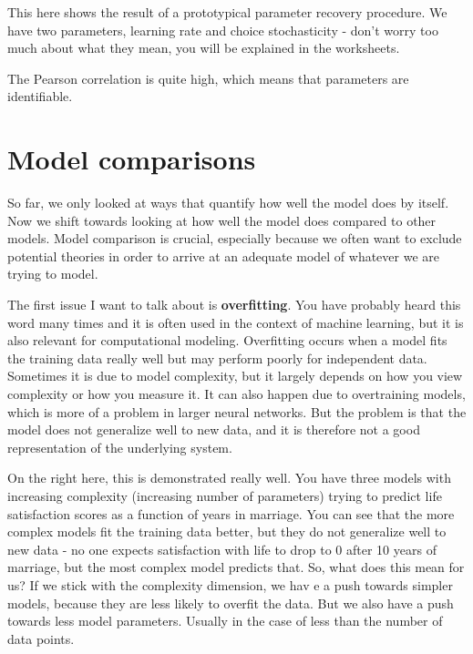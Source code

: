\documentclass[12pt]{article}
\begin{document}
This here shows the result of a prototypical parameter recovery procedure. We have two parameters, learning rate and choice stochasticity - don't worry too much about what they mean, you will be explained in the worksheets.

The Pearson correlation is quite high, which means that parameters are identifiable.

\section{Model comparisons}

So far, we only looked at ways that quantify how well the model does by itself. Now we shift towards looking at how well the model does compared to other models. Model comparison is crucial, especially because we often want to exclude potential theories in order to arrive at an adequate model of whatever we are trying to model.

The first issue I want to talk about is \textbf{overfitting}. You have probably heard this word many times and it is often used in the context of machine learning, but it is also relevant for computational modeling. Overfitting occurs when a model fits the training data really well but may perform poorly for independent data. Sometimes it is due to model complexity, but it largely depends on how you view complexity or how you measure it. It can also happen due to overtraining models, which is more of a problem in larger neural networks. But the problem is that the model does not generalize well to new data, and it is therefore not a good representation of the underlying system.

On the right here, this is demonstrated really well. You have three models with increasing complexity (increasing number of parameters) trying to predict life satisfaction scores as a function of years in marriage. You can see that the more complex models fit the training data better, but they do not generalize well to new data - no one expects satisfaction with life to drop to 0 after 10 years of marriage, but the most complex model predicts that. So, what does this mean for us? If we stick with the complexity dimension, we hav e a push towards simpler models, because they are less likely to overfit the data. But we also have a push towards less model parameters. Usually in the case of less than the number of data points.
\end{document}
